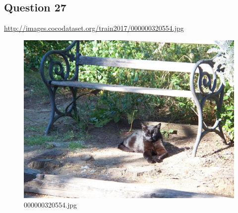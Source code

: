 \subsection*{Question 27}
\url{http://images.cocodataset.org/train2017/000000320554.jpg}
    \begin{figure}[h]
        \centering
        \includegraphics[width=0.8\linewidth]{../image set/easy/000000320554.jpg}
        \caption{000000320554.jpg}
    \end{figure}
